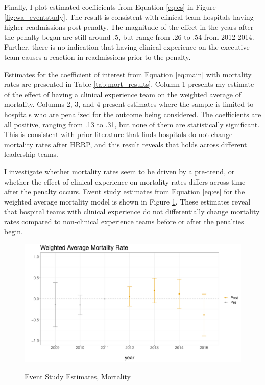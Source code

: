 \documentclass[12pt]{article}
\begin{document}
    Finally, I plot estimated coefficients from Equation \ref{eq:es} in Figure \ref{fig:wa_eventstudy}. The result is consistent with clinical team hospitals having higher readmissions post-penalty. The magnitude of the effect in the years after the penalty began are still around .5, but range from .26 to .54 from 2012-2014. Further, there is no indication that having clinical experience on the executive team causes a reaction in readmissions prior to the penalty. 


    Estimates for the coefficient of interest from Equation \ref{eq:main} with mortality rates are presented in Table \ref{tab:mort_results}. Column 1 presents my estimate of the effect of having a clinical experience team on the weighted average of mortality. Columns 2, 3, and 4 present estimates where the sample is limited to hospitals who are penalized for the outcome being considered. The coefficients are all positive, ranging from .13 to .31, but none of them are statistically significant. This is consistent with prior literature that finds hospitals do not change mortality rates after HRRP, and this result reveals that holds across different leadership teams. 



    I investigate whether mortality rates seem to be driven by a pre-trend, or whether the effect of clinical experience on mortality rates differs across time after the penalty occurs. Event study estimates from Equation \ref{eq:es} for the weighted average mortality model is shown in Figure \ref{fig:wa_eventstudy_mort}. These estimates reveal that hospital teams with clinical experience do not differentially change mortality rates compared to non-clinical experience teams before or after the penalties begin. 

    \begin{figure}[ht!]
        \caption{Event Study Estimates, Mortality}
        \includegraphics[scale=.5]{Objects/mort_es_graph.pdf}
        \label{fig:wa_eventstudy_mort}
    \end{figure}
\end{document}
